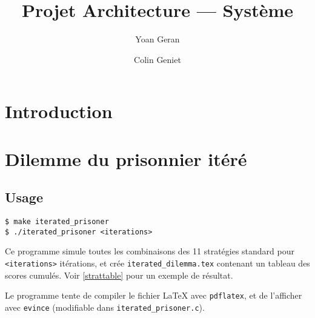 \documentclass[10pt]{article}
\title{Projet Architecture --- Système}
\author{Yoan Geran \and Colin Geniet}
\begin{document}
\maketitle
\tableofcontents

\section*{Introduction}

\section{Dilemme du prisonnier itéré}
\subsection{Usage}
\begin{verbatim}
$ make iterated_prisoner
$ ./iterated_prisoner <iterations>
\end{verbatim}

Ce programme simule toutes les combinaisons des 11 stratégies standard pour \verb|<iterations>| itérations,
et crée \verb|iterated_dilemma.tex| contenant un tableau des scores cumulés.
Voir \ref{strattable} pour un exemple de résultat.

Le programme tente de compiler le fichier \LaTeX{} avec \verb|pdflatex|, et de l'afficher avec \verb|evince|
(modifiable dans \verb|iterated_prisoner.c|).
\end{document}
